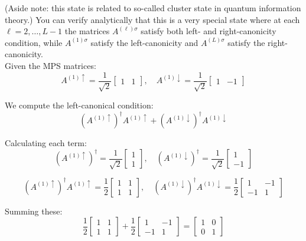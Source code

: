 \documentclass[12pt]{article}
\begin{document}
(Aside note: this state is related to so-called cluster state in quantum information theory.) You can verify analytically that this is a very special state where at each $\ell=2, \ldots, L-1$ the matrices $A^{(\ell) \sigma}$ satisfy both left- and right-canonicity condition, while $A^{(1) \sigma}$ satisfy the left-canonicity and $A^{(L) \sigma}$ satisfy the right-canonicity. \\
Given the MPS matrices:
\[
A^{(1) \uparrow} = \frac{1}{\sqrt{2}}
\begin{bmatrix}
1 & 1
\end{bmatrix}, \quad
A^{(1) \downarrow} = \frac{1}{\sqrt{2}}
\begin{bmatrix}
1 & -1
\end{bmatrix}
\]

We compute the left-canonical condition:
\[
\left(A^{(1) \uparrow}\right)^\dagger A^{(1) \uparrow} + \left(A^{(1) \downarrow}\right)^\dagger A^{(1) \downarrow}
\]

Calculating each term:
\[
\left(A^{(1) \uparrow}\right)^\dagger = \frac{1}{\sqrt{2}}
\begin{bmatrix}
1 \\
1
\end{bmatrix}, \quad
\left(A^{(1) \downarrow}\right)^\dagger = \frac{1}{\sqrt{2}}
\begin{bmatrix}
1 \\
-1
\end{bmatrix}
\]

\[
\left(A^{(1) \uparrow}\right)^\dagger A^{(1) \uparrow} = \frac{1}{2}
\begin{bmatrix}
1 & 1 \\
1 & 1
\end{bmatrix}, \quad
\left(A^{(1) \downarrow}\right)^\dagger A^{(1) \downarrow} = \frac{1}{2}
\begin{bmatrix}
1 & -1 \\
-1 & 1
\end{bmatrix}
\]

Summing these:
\[
\frac{1}{2}
\begin{bmatrix}
1 & 1 \\
1 & 1
\end{bmatrix} + \frac{1}{2}
\begin{bmatrix}
1 & -1 \\
-1 & 1
\end{bmatrix} = 
\begin{bmatrix}
1 & 0 \\
0 & 1
\end{bmatrix}
\]
\end{document}
